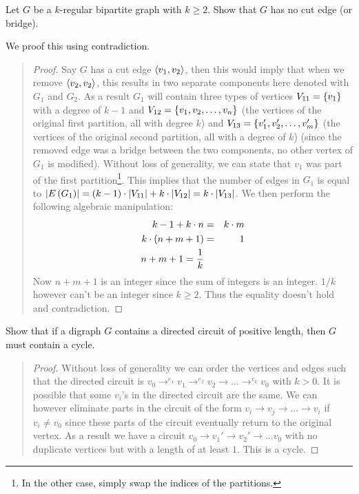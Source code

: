 \documentclass{article}
\begin{document}
\begin{exercise}
Let $G$ be a $k$-regular bipartite graph with $k\geq2$. Show that $G$ has no cut edge (or bridge).
\begin{answer}
We proof this using contradiction.
\begin{quote}\begin{proof}
Say $G$ has a cut edge $\left\langle v_1,v_2 \right\rangle$, then this would imply that when we remove $\left\langle v_2,v_2 \right\rangle$, this results in two separate components here denoted with $G_1$ and $G_2$. As a result $G_1$ will contain three types of vertices $V_{11}=\left\{ v_1 \right\}$ with a degree of $k-1$ and $V_{12}=\left\{ v_1,v_2,\ldots,v_n \right\}$ (the vertices of the original first partition, all with degree $k$) and $V_{13}=\left\{ v_1',v_2',\ldots,v_m' \right\}$ (the vertices of the original second partition, all with a degree of $k$) (since the removed edge was a bridge between the two components, no other vertex of $G_1$ is modified). Without loss of generality, we can state that $v_1$ was part of the first partition\footnote{In the other case, simply swap the indices of the partitions.}. This implies that the number of edges in $G_1$ is equal to $\left|E\left( G_1 \right)\right|=\left( k-1 \right)\cdot\left|V_{11}\right|+k\cdot\left|V_{12}\right|=k\cdot\left|V_{13}\right|$. We then perform the following algebraic manipulation:
\begin{eqnarray}
k-1+k\cdot n&=&k\cdot m\\
k\cdot\left( n+m+1 \right)&=&1\\
n+m+1=\displaystyle\frac{1}{k}
\end{eqnarray}
Now $n+m+1$ is an integer since the sum of integers is an integer. $1/k$ however can't be an integer since $k\geq2$. Thus the equality doesn't hold and contradiction.
\end{proof}\end{quote}
\end{answer}
\end{exercise}

\begin{exercise}
Show that if a digraph $G$ contains a directed circuit of positive length, then $G$ must contain a cycle.
\begin{answer}
\begin{quote}\begin{proof}
Without loss of generality we can order the vertices and edges such that the directed circuit is $v_0\rightarrow^{e_1}v_1\rightarrow^{e_2}v_2\rightarrow\ldots\rightarrow^{v_k}v_0$ with $k>0$. It is possible that some $v_i$'s in the directed circuit are the same. We can however eliminate parts in the circuit of the form $v_i\rightarrow v_j\rightarrow\ldots\rightarrow v_i$ if $v_i\neq v_0$ since these parts of the circuit eventually return to the original vertex. As a result we have a circuit $v_0\rightarrow v_1'\rightarrow v_2'\rightarrow\ldots v_0$ with no duplicate vertices but with a length of at least $1$. This is a cycle.
\end{proof}\end{quote}
\end{answer}
\end{exercise}
\end{document}
